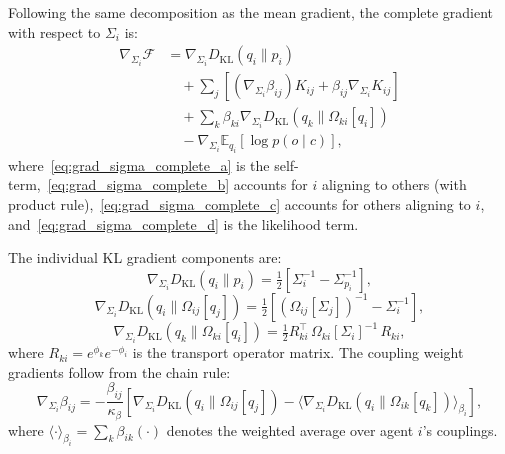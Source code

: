 \documentclass[twoside,11pt]{article}
\begin{document}
Following the same decomposition as the mean gradient, the complete gradient with respect to $\Sigma_i$ is:
\begin{align}
\nabla_{\Sigma_i} \mathcal{F} &= 
\nabla_{\Sigma_i} D_{\mathrm{KL}}(q_i \| p_i) \label{eq:grad_sigma_complete_a} \\
&\quad + \sum_j \left[(\nabla_{\Sigma_i} \beta_{ij}) K_{ij} + \beta_{ij} \nabla_{\Sigma_i} K_{ij}\right] \label{eq:grad_sigma_complete_b} \\
&\quad + \sum_k \beta_{ki} \nabla_{\Sigma_i} D_{\mathrm{KL}}(q_k \| \Omega_{ki}[q_i]) \label{eq:grad_sigma_complete_c} \\
&\quad - \nabla_{\Sigma_i} \mathbb{E}_{q_i}[\log p(o \mid c)], \label{eq:grad_sigma_complete_d}
\end{align}
where~\eqref{eq:grad_sigma_complete_a} is the self-term,~\eqref{eq:grad_sigma_complete_b} accounts for $i$ aligning to others (with product rule),~\eqref{eq:grad_sigma_complete_c} accounts for others aligning to $i$, and~\eqref{eq:grad_sigma_complete_d} is the likelihood term.

The individual KL gradient components are:
\begin{equation}
\nabla_{\Sigma_i} D_{\mathrm{KL}}(q_i \| p_i) = 
\tfrac{1}{2}\left[\Sigma_i^{-1} - \Sigma_{p_i}^{-1}\right],
\label{eq:grad_sigma_self}
\end{equation}
\begin{equation}
\nabla_{\Sigma_i} D_{\mathrm{KL}}(q_i \| \Omega_{ij}[q_j]) = 
\tfrac{1}{2}\left[(\Omega_{ij}[\Sigma_j])^{-1} - \Sigma_i^{-1}\right],
\label{eq:grad_sigma_kl_forward}
\end{equation}
\begin{equation}
\nabla_{\Sigma_i} D_{\mathrm{KL}}(q_k \| \Omega_{ki}[q_i]) = 
\tfrac{1}{2} R_{ki}^\top \, \Omega_{ki}[\Sigma_i]^{-1} \, R_{ki},
\label{eq:grad_sigma_kl_backward}
\end{equation}
where $R_{ki} = e^{\phi_k} e^{-\phi_i}$ is the transport operator matrix. The coupling weight gradients follow from the chain rule:
\begin{equation}
\nabla_{\Sigma_i} \beta_{ij} = -\frac{\beta_{ij}}{\kappa_\beta} \left[\nabla_{\Sigma_i} D_{\mathrm{KL}}(q_i \| \Omega_{ij}[q_j]) - \langle \nabla_{\Sigma_i} D_{\mathrm{KL}}(q_i \| \Omega_{ik}[q_k]) \rangle_{\beta_i} \right],
\label{eq:grad_sigma_beta}
\end{equation}
where $\langle \cdot \rangle_{\beta_i} = \sum_k \beta_{ik}(\cdot)$ denotes the weighted average over agent $i$'s couplings.
\end{document}

